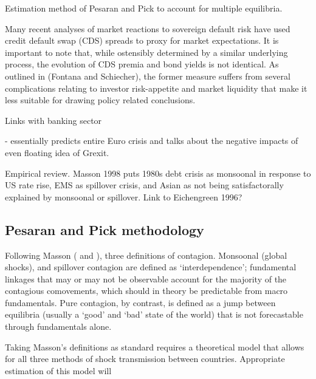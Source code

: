 \documentclass[../base.tex]{subfiles}
\begin{document}
Estimation method of Pesaran and Pick to account for multiple equilibria.


Many recent analyses of market reactions to sovereign default risk have used credit default swap (CDS) spreads to proxy for market expectations. It is important to note that, while ostensibly determined by a similar underlying process, the evolution of CDS premia and bond yields is not identical. As outlined in  (Fontana and Schiecher), the former measure suffers from several complications relating to investor risk-appetite and market liquidity that make it less suitable for drawing policy related conclusions.

Links with banking sector \cite{alter2012credit}



\cite{obstfeld1997destabilizing} - essentially predicts entire Euro crisis and talks about the negative impacts of even floating idea of Grexit.





















Empirical review. Masson 1998 puts 1980s debt crisis as monsoonal in response to US rate rise, EMS as spillover crisis, and Asian as not being satisfactorally explained by monsoonal or spillover. Link to Eichengreen 1996?






\subsection{Pesaran and Pick methodology}
Following Masson (\cite{masson1998contagion} and \cite{masson1999contagion}), three definitions of contagion. Monsoonal (global shocks), and spillover contagion are defined as `interdependence'; fundamental linkages that may or may not be observable account for the majority of the contagious comovements, which should in theory be predictable from macro fundamentals. Pure contagion, by contrast, is defined as a jump between equilibria (usually a `good' and `bad' state of the world) that is not forecastable through fundamentals alone. 

Taking Masson's definitions as standard requires a theoretical model that allows for all three methods of shock transmission between countries. Appropriate estimation of this model will 
\end{document}
